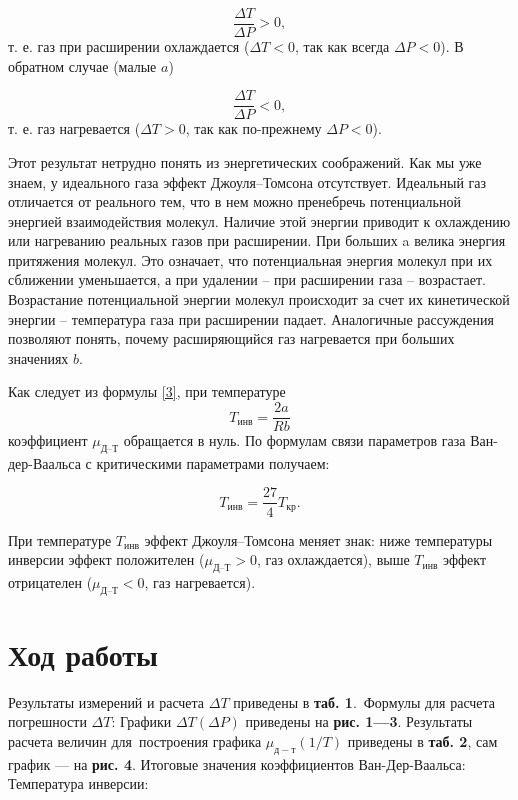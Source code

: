 \documentclass[a4paper, 12pt]{article}
\begin{document}
\[ \frac{\Delta T}{\Delta P} > 0, \]
т. е. газ при расширении охлаждается ($ \Delta T < 0 $, так как всегда $ \Delta P < 0 $). В обратном случае (малые $ a $)

\[ \frac{\Delta T}{\Delta P} < 0, \]
т. е. газ нагревается ($ \Delta T > 0 $, так как по-прежнему $ \Delta P < 0 $).

Этот результат нетрудно понять из энергетических соображений. Как мы уже знаем, у идеального газа эффект Джоуля–Томсона отсутствует. Идеальный газ отличается от реального тем, что в нем можно пренебречь потенциальной энергией взаимодействия молекул. Наличие этой энергии приводит к охлаждению или нагреванию реальных газов при расширении. При больших a велика энергия притяжения молекул. Это означает, что потенциальная энергия молекул при их сближении уменьшается, а при удалении -- при расширении газа -- возрастает. Возрастание потенциальной энергии молекул происходит за счет их кинетической энергии -- температура газа при расширении падает. Аналогичные рассуждения позволяют понять, почему расширяющийся газ нагревается при больших значениях $ b $.

Как следует из формулы \eqref{3}, при температуре \[ T_{\text{инв}} = \frac{2a}{Rb} \] коэффициент $ \mu_\text{Д--Т} $ обращается в нуль. По формулам связи параметров газа Ван-дер-Ваальса с критическими параметрами получаем: 

\begin{equation}\label{4}
T_\text{инв} = \frac{27}{4} T_\text{кр}.
\end{equation}

При температуре $ T_\text{инв} $ эффект Джоуля–Томсона меняет знак: ниже температуры инверсии эффект положителен ($ \mu_\text{Д--Т} > 0 $, газ охлаждается), выше $ T_\text{инв} $ эффект отрицателен ($ \mu_\text{Д--Т} < 0 $, газ нагревается).

\section{Ход работы}
Результаты измерений и расчета $\Delta T$ приведены в \textbf{таб. 1}.\ 
Формулы для расчета погрешности $\Delta T$:
Графики $\Delta T(\Delta P)$ приведены на \textbf{рис. 1---3}. Результаты расчета величин для\
построения графика $\mu_{д-т}(1/T)$ приведены в \textbf{таб. 2}, сам график --- на \textbf{рис. 4}.
Итоговые значения коэффициентов Ван-Дер-Ваальса:
\feq{a = (0.321 \pm 0.010)\ Н \cdot м^4/моль^2,\quad b = (154 \pm 8)\ см^3/моль.}
Температура инверсии:
\feq{T_i = \frac{2a}{Rb} = (500 \pm 30)\ К}
\end{document}

